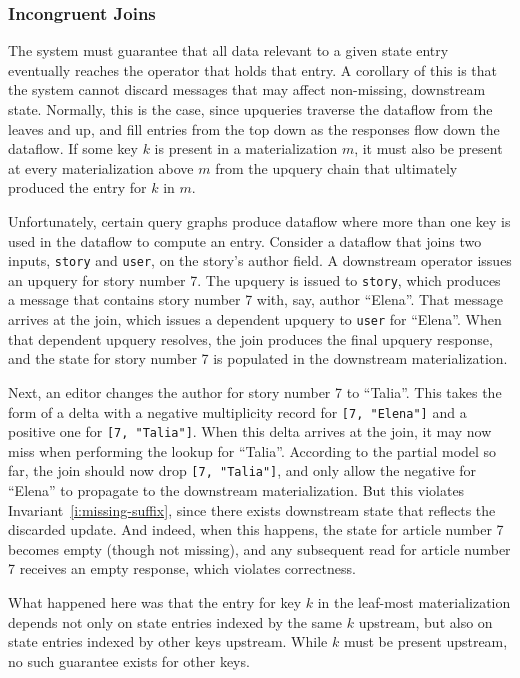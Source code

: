 \subsubsection{Incongruent Joins}

The system must guarantee that all data relevant to a given state entry
eventually reaches the operator that holds that entry. A corollary of this is
that the system cannot discard messages that may affect non-missing, downstream
state. Normally, this is the case, since upqueries traverse the dataflow from
the leaves and up, and fill entries from the top down as the responses flow down
the dataflow. If some key $k$ is present in a materialization $m$, it must also
be present at every materialization above $m$ from the upquery chain that
ultimately produced the entry for $k$ in $m$.

Unfortunately, certain query graphs produce dataflow where more than one key is
used in the dataflow to compute an entry. Consider a dataflow that joins two
inputs, \texttt{story} and \texttt{user}, on the story's author field. A
downstream operator issues an upquery for story number 7. The upquery is issued
to \texttt{story}, which produces a message that contains story number 7 with,
say, author ``Elena''. That message arrives at the join, which issues a
dependent upquery to \texttt{user} for ``Elena''. When that dependent upquery
resolves, the join produces the final upquery response, and the state for story
number 7 is populated in the downstream materialization.

Next, an editor changes the author for story number 7 to ``Talia''. This
takes the form of a delta with a negative multiplicity record for \texttt{[7,
"Elena"]} and a positive one for \texttt{[7, "Talia"]}. When this delta arrives
at the join, it may now miss when performing the lookup for ``Talia''. According
to the partial model so far, the join should now drop \texttt{[7, "Talia"]}, and
only allow the negative for ``Elena'' to propagate to the downstream
materialization. But this violates Invariant~\ref{i:missing-suffix}, since there
exists downstream state that reflects the discarded update. And indeed, when
this happens, the state for article number 7 becomes empty (though not missing),
and any subsequent read for article number 7 receives an empty response, which
violates correctness.

What happened here was that the entry for key $k$ in the leaf-most
materialization depends not only on state entries indexed by the same $k$
upstream, but also on state entries indexed by other keys upstream. While $k$
must be present upstream, no such guarantee exists for other keys.

